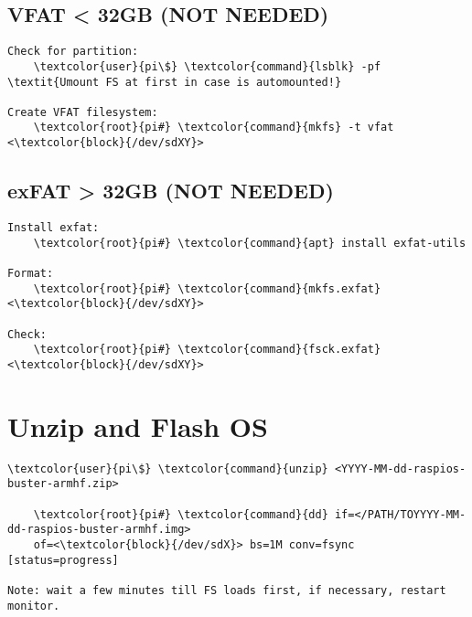 \documentclass[10pt, a4paper, onecolumn, openany]{book} %
\begin{document}
\subsection{VFAT < 32GB (NOT NEEDED)}
\begin{Verbatim}[commandchars=\\\{\}]
Check for partition:
    \textcolor{user}{pi\$} \textcolor{command}{lsblk} -pf
\textit{Umount FS at first in case is automounted!}

Create VFAT filesystem:
    \textcolor{root}{pi#} \textcolor{command}{mkfs} -t vfat <\textcolor{block}{/dev/sdXY}>
\end{Verbatim}
\subsection{exFAT > 32GB (NOT NEEDED)}
\begin{Verbatim}[commandchars=\\\{\}]
Install exfat:
    \textcolor{root}{pi#} \textcolor{command}{apt} install exfat-utils

Format:
    \textcolor{root}{pi#} \textcolor{command}{mkfs.exfat} <\textcolor{block}{/dev/sdXY}>
    
Check:
    \textcolor{root}{pi#} \textcolor{command}{fsck.exfat} <\textcolor{block}{/dev/sdXY}>
\end{Verbatim}

\section{Unzip and Flash OS}
\begin{Verbatim}[commandchars=\\\{\}]
    \textcolor{user}{pi\$} \textcolor{command}{unzip} <YYYY-MM-dd-raspios-buster-armhf.zip>

    \textcolor{root}{pi#} \textcolor{command}{dd} if=</PATH/TOYYYY-MM-dd-raspios-buster-armhf.img>    
    of=<\textcolor{block}{/dev/sdX}> bs=1M conv=fsync [status=progress]
    
Note: wait a few minutes till FS loads first, if necessary, restart monitor.
\end{Verbatim}

%
\end{document}
